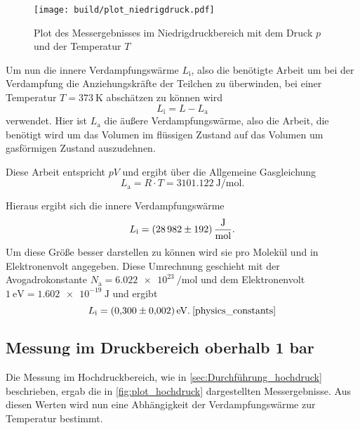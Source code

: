 \begin{figure}
    \centering
    \texttt{[image: build/plot\_niedrigdruck.pdf]}
    \caption{Plot des Messergebnisses im Niedrigdruckbereich mit dem Druck $p$ und der Temperatur $T$}
    \label{fig:plot_niedrigdruck}
\end{figure}

Um nun die innere Verdampfungswärme $L_\text{i}$, also die benötigte Arbeit um bei der Verdampfung die Anziehungskräfte der Teilchen zu überwinden, bei einer Temperatur $T=\SI{373}{\kelvin}$ abschätzen zu können wird
\begin{equation}
    L_\text{i} = L - L_\text{a}
\end{equation}
verwendet. 
Hier ist $L_\text{a}$ die äußere Verdampfungswärme, also die Arbeit, die benötigt wird um das Volumen im flüssigen Zustand auf das Volumen um gasförmigen Zustand auszudehnen.\cite{V203}

Diese Arbeit entspricht $pV$ und ergibt über die Allgemeine Gasgleichung
\begin{equation*}
    L_\text{a} = R \cdot T = \SI{3101.122}{\joule\per\mol}.
\end{equation*}

Hieraus ergibt sich die innere Verdampfungswärme
\begin{equation*}
    L_\text{i} = \SI{28982+-192}{\joule\per\mol}.
\end{equation*}
Um diese Größe besser darstellen zu können wird sie pro Molekül und in Elektronenvolt angegeben.
Diese Umrechnung geschieht mit der Avogadrokonstante $N_\text{a} = \SI{6.022e23}{\per\mol}$ und dem Elektronenvolt $\SI{1}{\electronvolt} = \SI{1.602e-19}{\joule}$ und ergibt
\begin{equation*}
    L_\text{i} = \SI{0.300+-0.002}{\electronvolt}. \: \text{\cite{physics_constants}}
\end{equation*}


\subsection{Messung im Druckbereich oberhalb 1 bar}
\label{sec:Auswertung_hochdruck}

Die Messung im Hochdruckbereich, wie in \autoref{sec:Durchführung_hochdruck} beschrieben, ergab die in \autoref{fig:plot_hochdruck} dargestellten Messergebnisse.
Aus diesen Werten wird nun eine Abhängigkeit der Verdampfungswärme zur Temperatur bestimmt.

